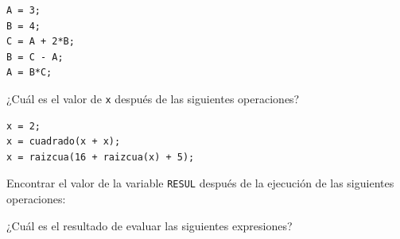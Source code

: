 \documentclass[spanish,addpoints,answers,a4paper]{exam}
\begin{document}
\begin{questions}
\begin{verbatim}
A = 3;
B = 4;
C = A + 2*B;
B = C - A;
A = B*C;
\end{verbatim}

\begin{solution}

\end{solution}

\question ¿Cuál es el valor de \texttt{x} después de las siguientes operaciones?

\begin{verbatim}
x = 2;
x = cuadrado(x + x);
x = raizcua(16 + raizcua(x) + 5);
\end{verbatim}

\begin{solution}

\end{solution}

\question Encontrar el valor de la variable \texttt{RESUL} después de la ejecución de las siguientes operaciones:
\begin{multicols}{2}
\end{multicols}

\begin{solution}

\end{solution}

\question ¿Cuál es el resultado de evaluar las siguientes expresiones?
\begin{multicols}{3}
\end{multicols}
\end{questions}
\end{document}
